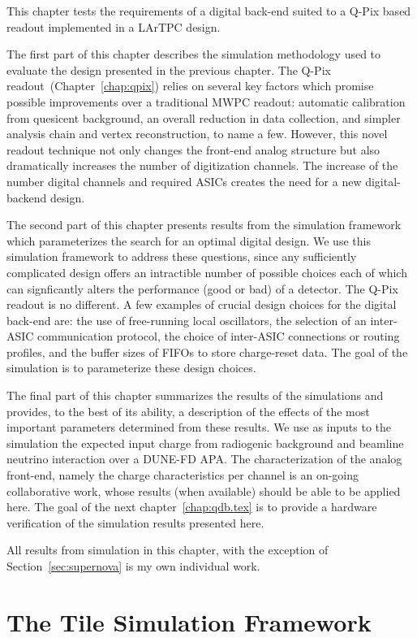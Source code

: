 This chapter tests the requirements of a digital back-end suited to a Q-Pix based readout implemented in a LArTPC design.

The first part of this chapter describes the simulation methodology used to evaluate the design presented in the previous chapter.
The Q-Pix readout~(Chapter~\ref{chap:qpix}) relies on several key factors which promise possible improvements over a traditional MWPC readout: automatic calibration from quesicent background, an overall reduction in data collection, and simpler analysis chain and vertex reconstruction, to name a few.
However, this novel readout technique not only changes the front-end analog structure but also dramatically increases the number of digitization channels.
The increase of the number digital channels and required ASICs creates the need for a new digital-backend design.

The second part of this chapter presents results from the simulation framework which parameterizes the search for an optimal digital design.
We use this simulation framework to address these questions, since any sufficiently complicated design offers an intractible number of possible choices each of which can signficantly alters the performance (good or bad) of a detector.
The Q-Pix readout is no different.
A few examples of crucial design choices for the digital back-end are: the use of free-running local oscillators, the selection of an inter-ASIC communication protocol, the choice of inter-ASIC connections or routing profiles, and the buffer sizes of FIFOs to store charge-reset data.
The goal of the simulation is to parameterize these design choices.

The final part of this chapter summarizes the results of the simulations and provides, to the best of its ability, a description of the effects of the most important parameters determined from these results.
We use as inputs to the simulation the expected input charge from radiogenic background and beamline neutrino interaction over a DUNE-FD APA.
The characterization of the analog front-end, namely the charge characteristics per channel is an on-going collaborative work, whose results (when available) should be able to be applied here.
The goal of the next chapter~\ref{chap:qdb.tex} is to provide a hardware verification of the simulation results presented here.

All results from simulation in this chapter, with the exception of Section~\ref{sec:supernova} is my own individual work.

\section{The Tile Simulation Framework}

